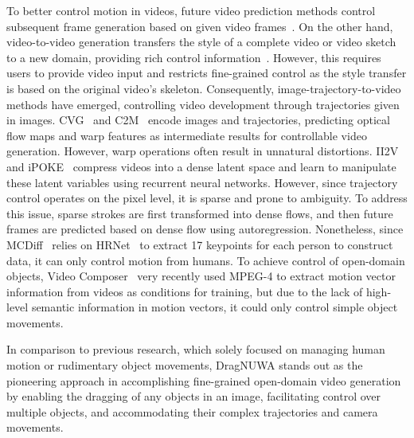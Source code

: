 \documentclass{article} %
\begin{document}
To better control motion in videos, future video prediction methods control subsequent frame generation based on given video frames~\citet{wuFutureVideoSynthesis2020,wichersHierarchicalLongtermVideo2018,walkerPoseKnowsVideo2017,liangDualMotionGAN2017}. On the other hand, video-to-video generation transfers the style of a complete video or video sketch to a new domain, providing rich control information~\citet{chanEverybodyDanceNow2019,wangFewshotVideotovideoSynthesis2019}. However, this requires users to provide video input and restricts fine-grained control as the style transfer is based on the original video's skeleton. Consequently, image-trajectory-to-video methods have emerged, controlling video development through trajectories given in images. CVG~\citet{haoControllableVideoGeneration2018} and C2M~\citet{ardinoClickMoveControlling2021} encode images and trajectories, predicting optical flow maps and warp features as intermediate results for controllable video generation. However, warp operations often result in unnatural distortions. II2V~\citet{blattmannUnderstandingObjectDynamics2021} and iPOKE~\citet{blattmannIpokePokingStill2021} compress videos into a dense latent space and learn to manipulate these latent variables using recurrent neural networks. However, since trajectory control operates on the pixel level, it is sparse and prone to ambiguity. To address this issue, sparse strokes are first transformed into dense flows, and then future frames are predicted based on dense flow using autoregression. Nonetheless, since MCDiff~\citet{chenMotionConditionedDiffusionModel2023} relies on HRNet~\citet{wangDeepHighResolutionRepresentation2021} to extract 17 keypoints for each person to construct data, it can only control motion from humans. To achieve control of open-domain objects, Video Composer~\citet{wangVideoComposerCompositionalVideo2023} very recently used MPEG-4 to extract motion vector information from videos as conditions for training, but due to the lack of high-level semantic information in motion vectors, it could only control simple object movements.

In comparison to previous research, which solely focused on managing human motion or rudimentary object movements, DragNUWA stands out as the pioneering approach in accomplishing fine-grained open-domain video generation by enabling the dragging of any objects in an image, facilitating control over multiple objects, and accommodating their complex trajectories and camera movements.
\end{document}
